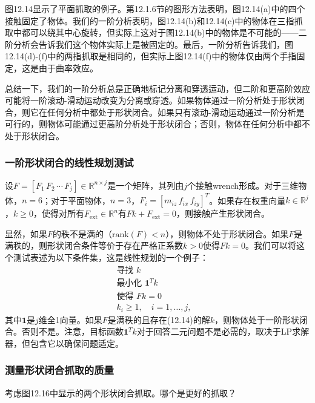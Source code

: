 \documentclass[12pt,a4paper]{article}
\begin{document}
图12.14显示了平面抓取的例子。第12.1.6节的图形方法表明，图12.14(a)中的四个接触固定了物体。我们的一阶分析表明，图12.14(b)和12.14(c)中的物体在三指抓取中都可以绕其中心旋转，但实际上这对于图12.14(b)中的物体是不可能的——二阶分析会告诉我们这个物体实际上是被固定的。最后，一阶分析告诉我们，图12.14(d)-(f)中的两指抓取是相同的，但实际上图12.14(f)中的物体仅由两个手指固定，这是由于曲率效应。

总结一下，我们的一阶分析总是正确地标记分离和穿透运动，但二阶和更高阶效应可能将一阶滚动-滑动运动改变为分离或穿透。如果物体通过一阶分析处于形状闭合，则它在任何分析中都处于形状闭合。如果只有滚动-滑动运动通过一阶分析是可行的，则物体可能通过更高阶分析处于形状闭合；否则，物体在任何分析中都不处于形状闭合。

\subsubsection{一阶形状闭合的线性规划测试}
\label{subsubsec:linear_programming_test}

设$F = [F_1 \, F_2 \, \cdots \, F_j] \in \mathbb{R}^{n \times j}$是一个矩阵，其列由$j$个接触wrench形成。对于三维物体，$n = 6$；对于平面物体，$n = 3$，$F_i = [m_{iz} \, f_{ix} \, f_{iy}]^T$。如果存在权重向量$k \in \mathbb{R}^j$，$k \geq 0$，使得对所有$F_{\text{ext}} \in \mathbb{R}^n$有$F k + F_{\text{ext}} = 0$，则接触产生形状闭合。

显然，如果$F$的秩不是满的（$\text{rank}(F) < n$），则物体不处于形状闭合。如果$F$是满秩的，则形状闭合条件等价于存在严格正系数$k > 0$使得$F k = 0$。我们可以将这个测试表述为以下条件集，这是线性规划的一个例子：
\begin{align}
\text{寻找 } k & \\
\text{最小化 } \mathbf{1}^T k & \\
\text{使得 } F k = 0 & \\
k_i \geq 1, \quad i = 1, \ldots, j, &
\end{align}
其中$\mathbf{1}$是$j$维全1向量。如果$F$是满秩的且存在(12.14)的解$k$，则物体处于一阶形状闭合。否则不是。注意，目标函数$\mathbf{1}^T k$对于回答二元问题不是必需的，取决于LP求解器，但包含它以确保问题适定。

\subsubsection{测量形状闭合抓取的质量}
\label{subsubsec:measuring_quality_form_closure}

考虑图12.16中显示的两个形状闭合抓取。哪个是更好的抓取？
\end{document}
